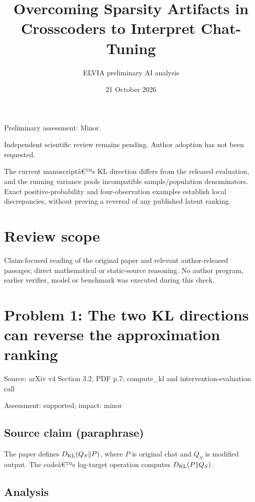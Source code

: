 \documentclass[11pt]{article}
\begin{document}
\title{Overcoming Sparsity Artifacts in Crosscoders to Interpret Chat-Tuning}

\author{ELVIA preliminary AI analysis}\date{21 October 2026}\maketitle

Preliminary assessment: Minor.\par

Independent scientific review remains pending. Author adoption has not been requested.

The current manuscriptâ€™s KL direction differs from the released evaluation, and the running variance pools incompatible sample/population denominators. Exact positive-probability and four-observation examples establish local discrepancies, without proving a reversal of any published latent ranking.

\section*{Review scope}

Claim-focused reading of the original paper and relevant author-released passages; direct mathematical or static-source reasoning. No author program, earlier verifier, model or benchmark was executed during this check.

\section*{Problem 1: The two KL directions can reverse the approximation ranking}

Source: arXiv v4 Section 3.2, PDF p.7; compute\_kl and intervention-evaluation call

Assessment: supported; impact: minor

\subsection*{Source claim (paraphrase)}

The paper defines \(D_{\rm KL}(Q_S\Vert P)\), where \(P\) is original chat and \(Q_S\) is modified output. The codeâ€™s log-target operation computes \(D_{\rm KL}(P\Vert Q_S)\).

\subsection*{Analysis}
\end{document}
